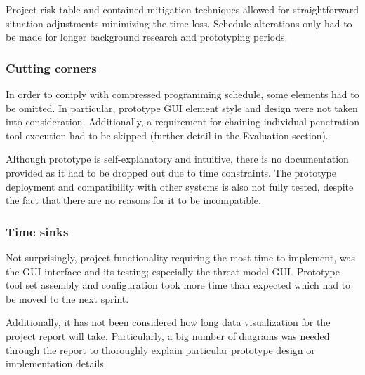 		Project risk table and contained mitigation techniques allowed for straightforward situation adjustments minimizing the time loss. Schedule alterations only had to be made for longer background research and prototyping periods.
		
		\subsubsection{Cutting corners}\label{sec:cut-corners}
		In order to comply with compressed programming schedule, some elements had to be omitted. In particular, prototype GUI element style and design were not taken into consideration. Additionally, a requirement for chaining individual penetration tool execution had to be skipped (further detail in the Evaluation section). 
		
		Although prototype is self-explanatory and intuitive, there is no documentation provided as it had to be dropped out due to time constraints. The prototype deployment and compatibility with other systems is also not fully tested, despite the fact that there are no reasons for it to be incompatible. 
		
		\subsubsection{Time sinks}
		Not surprisingly, project functionality requiring the most time to implement, was the GUI interface and its testing; especially the threat model GUI. Prototype tool set assembly and configuration took more time than expected which had to be moved to the next sprint. 
		
		Additionally, it has not been considered how long data visualization for the project report will take. Particularly, a big number of diagrams was needed through the report to thoroughly explain particular prototype design or implementation details. 
